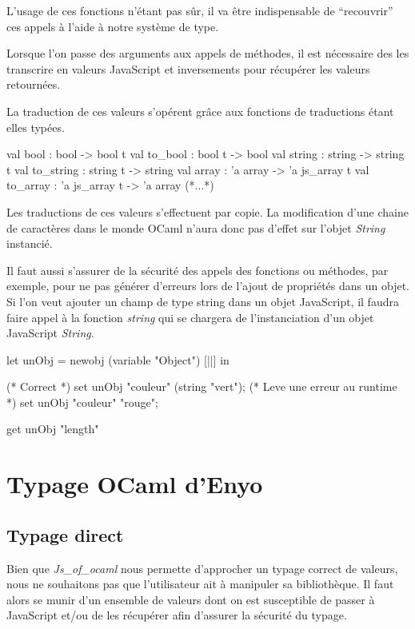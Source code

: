 \documentclass[11pt,a4paper]{report}
\begin{document}
L'usage de ces fonctions n'étant pas sûr, il va être indispensable de ``recouvrir'' ces appels
à l'aide à notre système de type.

Lorsque l'on passe des arguments aux appels de méthodes, il est nécessaire des les transcrire
en valeurs JavaScript et inversements pour récupérer les valeurs retournées.

La traduction de ces valeurs s'opérent grâce aux fonctions de traductions étant elles typées.
\begin{OCaml}
  val bool : bool -> bool t
  val to_bool : bool t -> bool
  val string : string -> string t
  val to_string : string t -> string
  val array : 'a array -> 'a js_array t
  val to_array : 'a js_array t -> 'a array
  (*...*)
\end{OCaml}

Les traductions de ces valeurs s'effectuent par copie. La modification d'une chaine de
caractères dans le monde OCaml n'aura donc pas d'effet sur l'objet \emph{String} instancié.

Il faut aussi s'assurer de la sécurité des appels des fonctions ou méthodes, par exemple,
pour ne pas générer d'erreurs lors de l'ajout de propriétés dans un objet. Si l'on veut ajouter 
un champ de type string dans un objet JavaScript, il faudra faire appel à la fonction 
\emph{string} qui se chargera de l'instanciation d'un objet JavaScript \emph{String}.

\begin{OCaml}
  let unObj = newobj (variable "Object") [||] in

  (* Correct *)
  set unObj "couleur" (string "vert");
  (* Leve une erreur au runtime *)
  set unObj "couleur" "rouge";

  get unObj "length"
\end{OCaml}

\section{Typage OCaml d'Enyo}
\subsection{Typage direct}

Bien que \emph{Js\_of\_ocaml} nous permette d'approcher un typage correct de valeurs, nous ne souhaitons pas
que l'utilisateur ait à manipuler sa bibliothèque.
Il faut alors se munir d'un ensemble de valeurs dont on est susceptible de passer à JavaScript
et/ou de les récupérer afin d'assurer la sécurité du typage.
\end{document}
